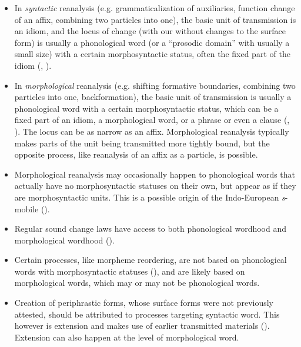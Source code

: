 \documentclass[a4paper, oneside, scheme=plain, 12pt]{article}
\newcommand{\form}[1]{\emph{#1}}
\begin{document}
\begin{itemize}
    \item In \emph{syntactic} reanalysis (e.g. grammaticalization of auxiliaries,
    function change of an affix, combining two particles into one),
    the basic unit of transmission is an idiom, 
    and the locus of change (with our without changes to the surface form)
    is usually a phonological word (or a ``prosodic domain'' with usually a small size)
    with a certain morphosyntactic status,
    often the fixed part of the idiom (, ).
    \item In \emph{morphological} reanalysis (e.g. shifting formative boundaries, combining two particles into one, backformation),
    the basic unit of transmission is usually a phonological word with a certain morphosyntactic status,
    which can be a fixed part of an idiom, a morphological word,
    or a phrase or even a clause (, ).
    The locus can be as narrow as an affix.
    Morphological reanalysis typically makes parts of the unit being transmitted more tightly bound,
    but the opposite process, like reanalysis of an affix as a particle, is possible.
    \item Morphological reanalysis may occasionally happen to phonological words that actually
    have no morphosyntactic statuses on their own,
    but appear as if they are morphosyntactic units.
    This is a possible origin of the Indo-European \form{s}-mobile ().
    \item Regular sound change laws have access to both phonological wordhood and morphological wordhood ().
    \item Certain processes, like morpheme reordering, are not based on phonological words with morphosyntactic statuses (),
    and are likely based on morphological words, which may or may not be phonological words.
    \item Creation of periphrastic forms, whose surface forms were not previously attested,
    should be attributed to processes targeting syntactic word.
    This however is extension and makes use of earlier transmitted materials ().
    Extension can also happen at the level of morphological word.
\end{itemize}
\end{document}
